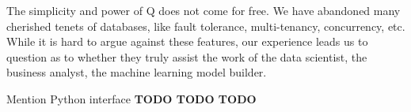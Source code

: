 The simplicity and power of Q does not come for free. We have abandoned many
cherished tenets of databases, like fault tolerance, multi-tenancy, concurrency,
etc. While it is hard to argue against these features, our experience leads us
to question as to whether they truly assist the work of the data scientist, the
business analyst, the machine learning model builder. 

Mention Python interface {\bf TODO TODO TODO }
